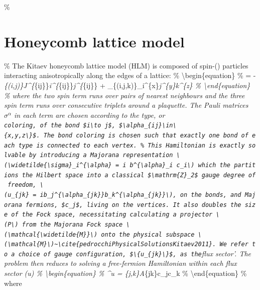 \%

\section{Honeycomb lattice model}

\% The Kitaev honeycomb lattice model (HLM) is composed of
spin-() particles interacting anisotropically along the edges
of a lattice: \% \textbackslash begin\{equation\} \%  =
-\sum\emph{\{(i,j)\}J\^{}\{\alpha}\{ij\}\}\sigma\emph{i\^{}\{\alpha}\{ij\}\}\sigma\emph{j\^{}\{\alpha}\{ij\}\}
+
\kappa\sum\_\{(i,j,k)\}\sigma\_i\^{}\{x\}\sigma\emph{j\^{}\{y\}\sigma\emph{k\^{}\{z\}
\% \textbackslash end\{equation\} \% where the two spin term runs over
pairs of nearest neighbours and the three spin term runs over
consecutive triplets around a plaquette. The Pauli matrices
\(\sigma^\alpha\) in each term are chosen according to the type, or
\texttt{coloring\textquotesingle{},\ of\ the\ bond\ \$i\textbackslash{}to\ j\$,\ \$\textbackslash{}alpha\_\{ij\}\textbackslash{}in\textbackslash{}\{x,y,z\textbackslash{}\}\$.\ The\ bond\ coloring\ is\ chosen\ such\ that\ exactly\ one\ bond\ of\ each\ type\ is\ connected\ to\ each\ vertex.\ \%\ This\ Hamiltonian\ is\ exactly\ solvable\ by\ introducing\ a\ Majorana\ representation\ \textbackslash{}(\textbackslash{}widetilde\{\textbackslash{}sigma\}\_i\^{}\{\textbackslash{}alpha\}\ =\ i\ b\^{}\{\textbackslash{}alpha\}\_i\ c\_i\textbackslash{})\ which\ the\ partitions\ the\ Hilbert\ space\ into\ a\ classical\ \$\textbackslash{}mathrm\{Z\}\_2\$\ gauge\ degree\ of\ freedom,\ \textbackslash{}(u\_\{jk\}\ =\ ib\_j\^{}\{\textbackslash{}alpha\_\{jk\}\}b\_k\^{}\{\textbackslash{}alpha\_\{jk\}\}\textbackslash{}),\ on\ the\ bonds,\ and\ Majorana\ fermions,\ \$c\_j\$,\ living\ on\ the\ vertices.\ It\ also\ doubles\ the\ size\ of\ the\ Fock\ space,\ necessitating\ calculating\ a\ projector\ \textbackslash{}(P\textbackslash{})\ from\ the\ Majorana\ Fock\ space\ \textbackslash{}(\textbackslash{}mathcal\{\textbackslash{}widetilde\{M\}\}\textbackslash{})\ onto\ the\ physical\ subspace\ \textbackslash{}(\textbackslash{}mathcal\{M\}\textbackslash{})\textasciitilde{}\textbackslash{}cite\{pedrocchiPhysicalSolutionsKitaev2011\}.\ We\ refer\ to\ a\ choice\ of\ gauge\ configuration,\ \$\textbackslash{}\{u\_\{jk\}\textbackslash{}\}\$,\ as\ the}flux
sector'. The problem then reduces to solving a free-fermion Hamiltonian
within each flux sector (u) \% \textbackslash begin\{equation\} \%
\^{}u = \sum}\{j,k\}A}\{jk\}c\_jc\_k
\% \textbackslash end\{equation\} \% where
